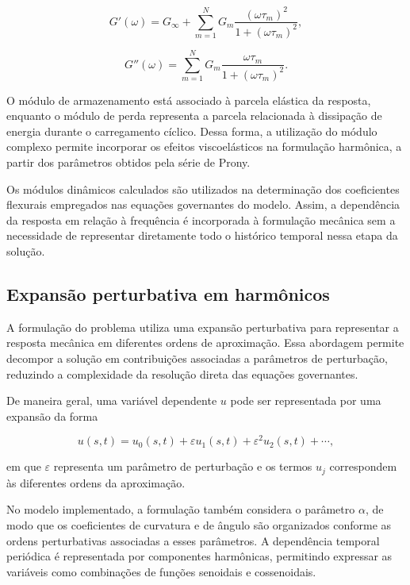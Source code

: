 \documentclass[arial,centeredequations,english,brazilian,oneside,section=TITLE]{ifes8}
\begin{document}
\begin{equation}
  G'(\omega) =
  G_{\infty} +
  \sum_{m=1}^{N}
  G_m
  \frac{(\omega\tau_m)^2}
  {1+(\omega\tau_m)^2},
  \label{eq:modulo-armazenamento}
\end{equation}

\begin{equation}
  G''(\omega) =
  \sum_{m=1}^{N}
  G_m
  \frac{\omega\tau_m}
  {1+(\omega\tau_m)^2}.
  \label{eq:modulo-perda}
\end{equation}

O módulo de armazenamento está associado à parcela elástica da
resposta, enquanto o módulo de perda representa a parcela relacionada
à dissipação de energia durante o carregamento cíclico. Dessa forma,
a utilização do módulo complexo permite incorporar os efeitos
viscoelásticos na formulação harmônica, a partir dos parâmetros
obtidos pela série de Prony.

Os módulos dinâmicos calculados são utilizados na determinação dos
coeficientes flexurais empregados nas equações governantes do modelo.
Assim, a dependência da resposta em relação à frequência é incorporada
à formulação mecânica sem a necessidade de representar diretamente
todo o histórico temporal nessa etapa da solução.

\subsection{Expansão perturbativa em harmônicos}
\label{subsec:expansao-perturbativa}

A formulação do problema utiliza uma expansão perturbativa para
representar a resposta mecânica em diferentes ordens de aproximação.
Essa abordagem permite decompor a solução em contribuições associadas
a parâmetros de perturbação, reduzindo a complexidade da resolução
direta das equações governantes.

De maneira geral, uma variável dependente $u$ pode ser representada
por uma expansão da forma

\begin{equation}
  u(s,t) =
  u_0(s,t) +
  \varepsilon u_1(s,t) +
  \varepsilon^2 u_2(s,t) + \cdots,
  \label{eq:expansao-perturbativa}
\end{equation}

em que $\varepsilon$ representa um parâmetro de perturbação e os
termos $u_j$ correspondem às diferentes ordens da aproximação.

No modelo implementado, a formulação também considera o parâmetro
$\alpha$, de modo que os coeficientes de curvatura e de ângulo são
organizados conforme as ordens perturbativas associadas a esses
parâmetros. A dependência temporal periódica é representada por
componentes harmônicas, permitindo expressar as variáveis como
combinações de funções senoidais e cossenoidais.
\end{document}
